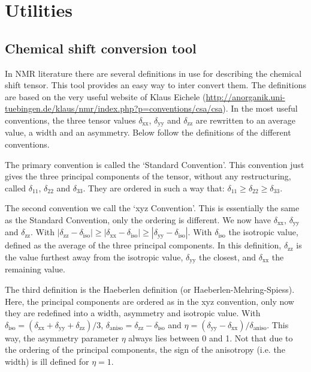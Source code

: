 \documentclass[11pt,a4paper]{article}
\begin{document}
\section{Utilities}
\subsection{Chemical shift conversion tool}
In NMR literature there are several definitions in use for describing the chemical shift tensor. This tool provides an easy way to inter convert them. The definitions are based on the very useful website of Klaus Eichele (\url{http://anorganik.uni-tuebingen.de/klaus/nmr/index.php?p=conventions/csa/csa}). In the most useful conventions, the three tensor values $\delta_\text{xx}$, $\delta_\text{yy}$ and $\delta_\text{zz}$ are rewritten to an average value, a width and an asymmetry. Below follow the definitions of the different conventions.

The primary convention is called the `Standard Convention'. This convention just gives the three principal components of the tensor, without any restructuring, called $\delta_\text{11}$, $\delta_\text{22}$ and $\delta_\text{33}$. They are ordered in such a way that: $\delta_\text{11} \geq \delta_\text{22} \geq \delta_\text{33}$.

The second convention we call the `xyz Convention'. This is essentially the same as the Standard Convention, only the ordering is different. We now have $\delta_\text{xx}$, $\delta_\text{yy}$ and $\delta_\text{zz}$. With $|\delta_\text{zz}-\delta_\text{iso}| \geq |\delta_\text{xx}-\delta_\text{iso}| \geq |\delta_\text{yy}-\delta_\text{iso}|$. With $\delta_\text{iso}$ the isotropic value, defined as the average of the three principal components. In this definition, $\delta_\text{zz}$ is the value furthest away from the isotropic value, $\delta_\text{yy}$ the closest, and $\delta_\text{xx}$ the remaining value.

The third definition is the Haeberlen definition (or Haeberlen-Mehring-Spiess). Here, the principal components are ordered as in the xyz convention, only now they are redefined into a width, asymmetry and isotropic value. With $\delta_\text{iso} = (\delta_\text{xx} +\delta_\text{yy} +\delta_\text{zz})/3$, $\delta_\text{aniso} = \delta_\text{zz} -\delta_\text{iso}$ and $\eta = (\delta_\text{yy}-\delta_\text{xx})/\delta_\text{aniso}$. This way, the asymmetry parameter $\eta$ always lies between 0 and 1. Not that due to the ordering of the principal components, the sign of the anisotropy (i.e. the width) is ill defined for $\eta=1$.
\end{document}
